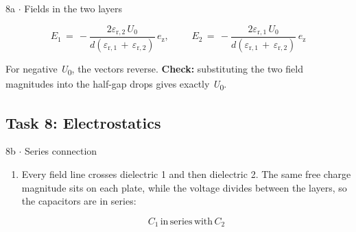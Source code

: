 \documentclass[11pt]{article}
\begin{document}
\begin{keepsection}
\begin{workedbox}{8a \ensuremath{\cdot} Fields in the two layers}
\begin{enumerate}
\begin{equation*}{E}_{1}\, =\, -\dfrac{2ε_{\mathrm{r},2}\, {U}_{0}}{{d}(ε_{\mathrm{r},1}\, +\, ε_{\mathrm{r},2})}\, {e}_{\mathrm{z}},\quad \, \quad \, {E}_{2}\, =\, -\dfrac{2ε_{\mathrm{r},1}\, {U}_{0}}{{d}(ε_{\mathrm{r},1}\, +\, ε_{\mathrm{r},2})}\, {e}_{\mathrm{z}}\end{equation*}

For negative \textit{U}\textsubscript{0}, the vectors reverse. \textbf{Check:} substituting the two field magnitudes into the half-gap drops gives exactly \textit{U}\textsubscript{0}.
\end{enumerate}
\end{workedbox}

\end{keepsection}
\begin{keepsection}\subsection{Task 8: Electrostatics}

\begin{workedbox}{8b \ensuremath{\cdot} Series connection}
\begin{enumerate}
\item {}
Every field line crosses dielectric 1 and then dielectric 2. The same free charge magnitude sits on each plate, while the voltage divides between the layers, so the capacitors are in series:

\begin{equation*}{C}_{1}\, \text{in}\, \text{series}\, \text{with}\, {C}_{2}\end{equation*}


\end{enumerate}
\end{workedbox}
\end{keepsection}
\end{document}
